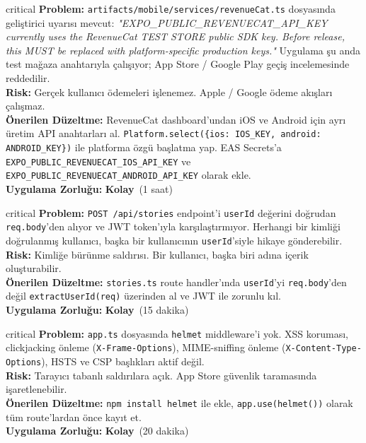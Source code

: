 \documentclass[12pt,a4paper]{article}
\newcommand{\EASY}{\textcolor{low}{\textbf{Kolay}}}
\begin{document}
\begin{auditbox}{critical}
\textbf{Problem:} \texttt{artifacts/mobile/services/revenueCat.ts} dosyasında geliştirici uyarısı mevcut: \textit{"EXPO\_PUBLIC\_REVENUECAT\_API\_KEY currently uses the RevenueCat TEST STORE public SDK key. Before release, this MUST be replaced with platform-specific production keys."} Uygulama şu anda test mağaza anahtarıyla çalışıyor; App Store / Google Play geçiş incelemesinde reddedilir.\\[0.3em]
\textbf{Risk:} Gerçek kullanıcı ödemeleri işlenemez. Apple / Google ödeme akışları çalışmaz.\\[0.3em]
\textbf{Önerilen Düzeltme:} RevenueCat dashboard'undan iOS ve Android için ayrı üretim API anahtarları al. \texttt{Platform.select(\{ios: IOS\_KEY, android: ANDROID\_KEY\})} ile platforma özgü başlatma yap. EAS Secrets'a \texttt{EXPO\_PUBLIC\_REVENUECAT\_IOS\_API\_KEY} ve \texttt{EXPO\_PUBLIC\_REVENUECAT\_ANDROID\_API\_KEY} olarak ekle.\\[0.3em]
\textbf{Uygulama Zorluğu:} \EASY\ (1 saat)
\end{auditbox}

\begin{auditbox}{critical}
\textbf{Problem:} \texttt{POST /api/stories} endpoint'i \texttt{userId} değerini doğrudan \texttt{req.body}'den alıyor ve JWT token'ıyla karşılaştırmıyor. Herhangi bir kimliği doğrulanmış kullanıcı, başka bir kullanıcının \texttt{userId}'siyle hikaye gönderebilir.\\[0.3em]
\textbf{Risk:} Kimliğe bürünme saldırısı. Bir kullanıcı, başka biri adına içerik oluşturabilir.\\[0.3em]
\textbf{Önerilen Düzeltme:} \texttt{stories.ts} route handler'ında \texttt{userId}'yi \texttt{req.body}'den değil \texttt{extractUserId(req)} üzerinden al ve JWT ile zorunlu kıl.\\[0.3em]
\textbf{Uygulama Zorluğu:} \EASY\ (15 dakika)
\end{auditbox}

\begin{auditbox}{critical}
\textbf{Problem:} \texttt{app.ts} dosyasında \texttt{helmet} middleware'i yok. XSS koruması, clickjacking önleme (\texttt{X-Frame-Options}), MIME-sniffing önleme (\texttt{X-Content-Type-Options}), HSTS ve CSP başlıkları aktif değil.\\[0.3em]
\textbf{Risk:} Tarayıcı tabanlı saldırılara açık. App Store güvenlik taramasında işaretlenebilir.\\[0.3em]
\textbf{Önerilen Düzeltme:} \texttt{npm install helmet} ile ekle, \texttt{app.use(helmet())} olarak tüm route'lardan önce kayıt et.\\[0.3em]
\textbf{Uygulama Zorluğu:} \EASY\ (20 dakika)
\end{auditbox}
\end{document}
